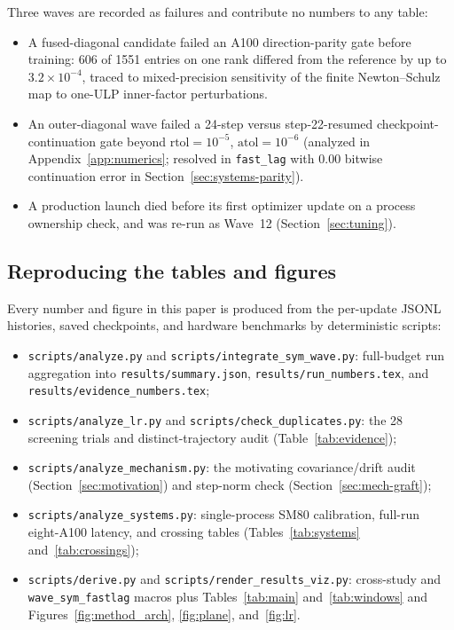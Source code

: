 Three waves are recorded as failures and contribute no numbers to any table:
\begin{itemize}
\item A fused-diagonal candidate failed an A100 direction-parity gate before
  training: 606 of 1551 entries on one rank differed from the reference by up to
  $3.2\times10^{-4}$, traced to mixed-precision sensitivity of the finite
  Newton--Schulz map to one-ULP inner-factor perturbations.
\item An outer-diagonal wave failed a 24-step versus step-22-resumed
  checkpoint-continuation gate beyond $\text{rtol}=10^{-5}$, $\text{atol}=10^{-6}$
  (analyzed in Appendix~\ref{app:numerics}; resolved in \texttt{fast\_lag} with
  $0.00$ bitwise continuation error in Section~\ref{sec:systems-parity}).
\item A production launch died before its first optimizer update on a process
  ownership check, and was re-run as Wave~12 (Section~\ref{sec:tuning}).
\end{itemize}

\subsection{Reproducing the tables and figures}

Every number and figure in this paper is produced from the per-update JSONL
histories, saved checkpoints, and hardware benchmarks by deterministic scripts:
\begin{itemize}\sloppy\setlength{\itemsep}{1pt}\setlength{\parskip}{0pt}\setlength{\topsep}{3pt}
\item \texttt{scripts/\allowbreak analyze.py} and \texttt{scripts/\allowbreak integrate\_\allowbreak sym\_\allowbreak wave.py}:
  full-budget run aggregation into \texttt{results/\allowbreak summary.json},
  \texttt{results/\allowbreak run\_\allowbreak numbers.tex}, and
  \texttt{results/\allowbreak evidence\_\allowbreak numbers.tex};
\item \texttt{scripts/analyze\_lr.py} and \texttt{scripts/check\_duplicates.py}:
  the 28 screening trials and distinct-trajectory audit (Table~\ref{tab:evidence});
\item \texttt{scripts/analyze\_mechanism.py}: the motivating covariance/drift
  audit (Section~\ref{sec:motivation}) and step-norm check
  (Section~\ref{sec:mech-graft});
\item \texttt{scripts/analyze\_systems.py}: single-process SM80 calibration,
  full-run eight-A100 latency, and crossing tables (Tables~\ref{tab:systems}
  and~\ref{tab:crossings});
\item \texttt{scripts/derive.py} and \texttt{scripts/render\_results\_viz.py}:
  cross-study and \texttt{wave\_\allowbreak sym\_\allowbreak fastlag} macros
  plus Tables~\ref{tab:main} and~\ref{tab:windows} and
  Figures~\ref{fig:method_arch}, \ref{fig:plane}, and~\ref{fig:lr}.
\end{itemize}
